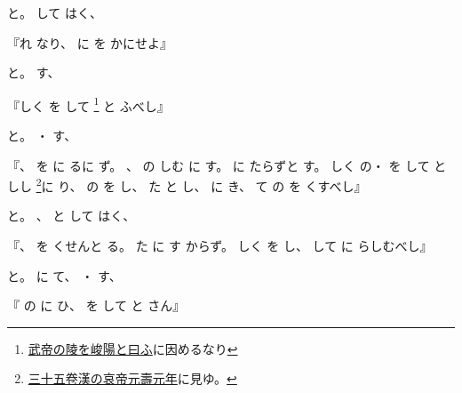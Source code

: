 \documentclass[a4paper,12pt]{article}
\begin{document}
と。%
して%
はく、%
\begin{quoting}
『れ%
なり、%
に%
を%
かにせよ』
\end{quoting}
と。%
%
%
す、%
\begin{quoting}
『しく%
を%
して%
\footnote{\hyperlink{shunyouryou}{武帝の陵を峻陽と曰ふ}に因めるなり}%
と%
ふべし』
\end{quoting}
と。%
%
・%
す、%
\begin{quoting}
『、%
を%
に%
るに%
ず。%
、%
の%
しむ%
に%
す。%
に%
たらずと%
す。%
しく%
の・%
を%
して%
と%
しし%
\footnote{\href{http://dl.ndl.go.jp/info:ndljp/pid/1239820/290}{三十五卷漢の哀帝元壽元年}に見ゆ。}に%
り、%
の%
を%
し、%
た%
と%
し、%
に%
き、%
て%
の%
を%
くすべし』
\end{quoting}
と。%
%
、%
%
%
と%
して%
はく、%
\begin{quoting}
『、%
を%
くせんと%
る。%
た%
に%
す%
からず。%
しく%
を%
し、%
して%
に%
らしむべし』
\end{quoting}
と。%
に%
て、%
・%
す、%
\begin{quoting}
『%
の%
に%
ひ、%
を%
して%
と%
さん』
\end{quoting}
\end{document}
